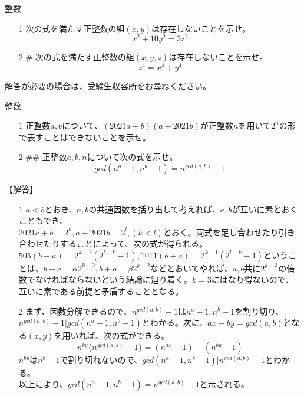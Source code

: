 \documentclass[a4paper,fleqn,dvipdfmx]{jsarticle}
\begin{document}
\begin{itembox}[l]{整数}

\begin{itemize}
    \item [1] 
    次の式を満たす正整数の組$(x,y)$は存在しないことを示せ。
    $$x^2+10y^2=3z^2$$
    \item [2] \#
    次の式を満たす正整数の組$(x,y,z)$は存在しないことを示せ。
    $$z^4=x^4+y^4$$
\end{itemize}

\end{itembox}
解答が必要の場合は、受験生収容所をお尋ねください。



\newpage


\begin{itembox}[l]{整数}

\begin{itemize}
    \item [1] 
    正整数$a,b$について、$(2021a+b)(a+2021b)$が正整数$n$を用いて$2^n$の形で表すことはできないことを示せ。
    \item [2] \#\# 正整数$a,b,n$について次の式を示せ。
    $$gcd(n^a-1,n^b-1)=n^{gcd(a,b)}-1$$
\end{itemize}

\end{itembox}


\begin{flushleft}
【解答】
\end{flushleft}

\begin{itemize}
    \item [1] 
    $a<b$とおき、$a,b$の共通因数を括り出して考えれば、$a,b$が互いに素とおくこともでき、\\$2021a+b=2^k,a+2021b=2^l,(k<l)$とおく。両式を足し合わせたり引き合わせたりすることによって、次の式が得られる。$505(b-a)=2^{k-2}(2^{l-k}-1),1011(b+a)=2^{k-1}(2^{l-k}+1)$ということは、$b-a=\alpha 2^{k-2},b+a=\beta2^{k-2}$などとおいてやれば、$a,b$共に$2^{k-3}$の倍数でなければならないという結論に辿り着く。$k=3$にはなり得ないので、互いに素である前提と矛盾することとなる。
    
    \item [2]
    まず、因数分解できるので、$n^{gcd(a,b)}-1$は$n^a-1,n^b-1$を割り切り、$n^{gcd(a,b)}-1|gcd(n^a-1,n^b-1)$とわかる。次に、$ax-by=gcd(a,b)$となる$(x,y)$を用いれば、次の式ができる。
    $$n^{by}\{n^{gcd(a,b)}-1\}=(n^{ax}-1)-(n^{by}-1)$$
    $n^{by}$は$n^b-1$で割り切れないので、$gcd(n^a-1,n^b-1)|n^{gcd(a,b)}-1$とわかる。\\
    以上により、$gcd(n^a-1,n^b-1)=n^{gcd(a,b)}-1$と示される。
\end{itemize}
\end{document}
